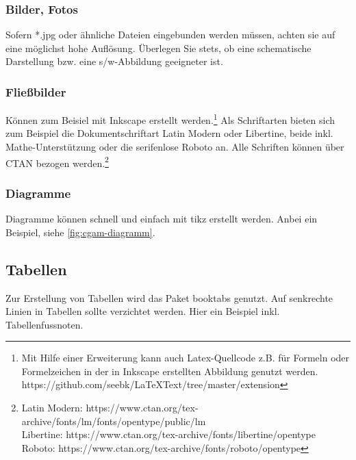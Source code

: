 \subsubsection{Bilder, Fotos}
\label{sec:latex-bilder}

Sofern *.jpg oder ähnliche Dateien eingebunden werden müssen, achten sie auf eine möglichst hohe Auflösung. Überlegen Sie stets, ob eine schematische Darstellung bzw. eine s/w-Abbildung geeigneter ist. 



\subsubsection{Fließbilder}
\label{sec:latex-fliessbilder}
Können zum Beisiel mit Inkscape erstellt werden.\footnote{Mit Hilfe einer Erweiterung kann auch Latex-Quellcode z.B. für Formeln oder Formelzeichen in der in Inkscape erstellten Abbildung genutzt werden. https://github.com/seebk/LaTeXText/tree/master/extension} Als Schriftarten bieten sich zum Beispiel die Dokumentschriftart Latin Modern oder Libertine, beide inkl. Mathe-Unterstützung oder die serifenlose Roboto an. Alle Schriften können über CTAN bezogen werden.\footnote{Latin Modern: https://www.ctan.org/tex-archive/fonts/lm/fonts/opentype/public/lm\\
Libertine: https://www.ctan.org/tex-archive/fonts/libertine/opentype\\
Roboto: https://www.ctan.org/tex-archive/fonts/roboto/opentype}


\subsubsection{Diagramme}
\label{sec:latex-diagramme}
Diagramme können schnell und einfach mit tikz erstellt werden. Anbei ein Beispiel, siehe \cref{fig:cgam-diagramm}.




\subsection{Tabellen}
\label{sec:latex-tabellen}

Zur Erstellung von Tabellen wird das Paket booktabs genutzt. Auf senkrechte Linien in Tabellen sollte verzichtet werden. Hier ein Beispiel inkl. Tabellenfussnoten. 

